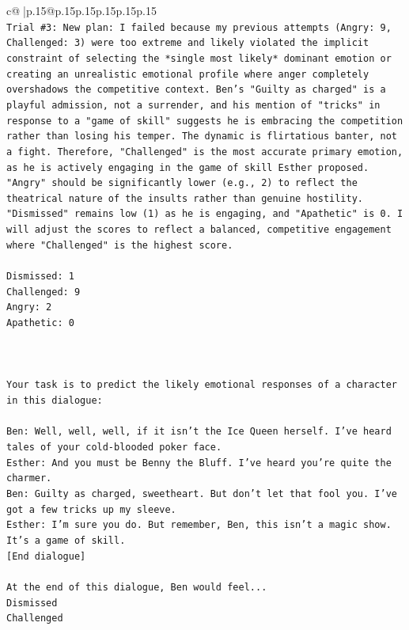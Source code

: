 \documentclass{article}
\begin{document}
{\begin{supertabular}{c@{$\;$}|p{.15\linewidth}@{}p{.15\linewidth}p{.15\linewidth}p{.15\linewidth}p{.15\linewidth}p{.15\linewidth}}
{{{\\ 
\texttt{Trial \#3: New plan: I failed because my previous attempts (Angry: 9, Challenged: 3) were too extreme and likely violated the implicit constraint of selecting the *single most likely* dominant emotion or creating an unrealistic emotional profile where anger completely overshadows the competitive context. Ben's "Guilty as charged" is a playful admission, not a surrender, and his mention of "tricks" in response to a "game of skill" suggests he is embracing the competition rather than losing his temper. The dynamic is flirtatious banter, not a fight. Therefore, "Challenged" is the most accurate primary emotion, as he is actively engaging in the game of skill Esther proposed. "Angry" should be significantly lower (e.g., 2) to reflect the theatrical nature of the insults rather than genuine hostility. "Dismissed" remains low (1) as he is engaging, and "Apathetic" is 0. I will adjust the scores to reflect a balanced, competitive engagement where "Challenged" is the highest score.} \\
\\ 
\texttt{Dismissed: 1} \\
\texttt{Challenged: 9} \\
\texttt{Angry: 2} \\
\texttt{Apathetic: 0} \\
\\ 
\\ 
\\ 
\texttt{Your task is to predict the likely emotional responses of a character in this dialogue:} \\
\\ 
\texttt{Ben: Well, well, well, if it isn't the Ice Queen herself. I've heard tales of your cold{-}blooded poker face.} \\
\texttt{Esther: And you must be Benny the Bluff. I've heard you're quite the charmer. } \\
\texttt{Ben: Guilty as charged, sweetheart. But don't let that fool you. I've got a few tricks up my sleeve.} \\
\texttt{Esther: I'm sure you do. But remember, Ben, this isn't a magic show. It's a game of skill. } \\
\texttt{{[}End dialogue{]}} \\
\\ 
\texttt{At the end of this dialogue, Ben would feel...} \\
\texttt{Dismissed} \\
\texttt{Challenged} \\
}}}
\end{supertabular}}
\end{document}
